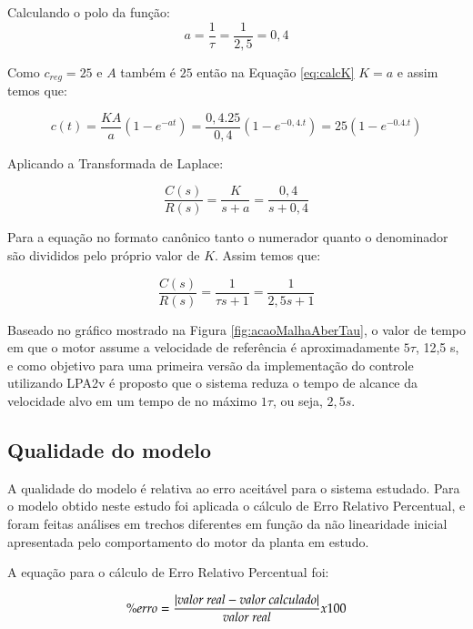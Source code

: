 Calculando o polo da função:
\begin{equation}
  a = \frac{1}{\tau} = \frac{1}{2,5} = 0,4
\end{equation}

Como $c_{reg} = 25$ e $A$ também é $25$ então na Equação \ref{eq:calcK} $K = a$ e assim temos que:

\begin{equation}
c(t) = \frac{KA}{a}(1-e^{-at}) = \frac{0,4.25}{0,4}(1-e^{-0,4.t}) = 25(1-e^{-0.4.t})
\end{equation}


Aplicando a Transformada de Laplace:

\begin{equation}
  \frac{C(s)}{R(s)} = \frac{K}{s+a} = \frac{0,4}{s+0,4}
\end{equation}


Para a equação no formato canônico tanto o numerador quanto o denominador são divididos pelo próprio valor de $K$. Assim temos que:

\begin{equation}
  \frac{C(s)}{R(s)} = \frac{1}{\tau s+1} = \frac{1}{2,5 s+1}
\end{equation}


Baseado no gráfico mostrado na Figura \ref{fig:acaoMalhaAberTau}, o valor de tempo em que o motor assume a velocidade de referência é aproximadamente $5\tau$, 12,5 s, e como objetivo para uma primeira versão da implementação do controle utilizando LPA2v é proposto que o sistema reduza o tempo de alcance da velocidade alvo em um tempo de no máximo $1\tau$, ou seja, $2,5 s$.


\subsection{ Qualidade do modelo }

A qualidade do modelo é relativa ao erro aceitável para o sistema estudado. Para o modelo obtido neste estudo foi aplicada o cálculo de Erro Relativo Percentual, e foram feitas análises em trechos diferentes em função da não linearidade inicial apresentada pelo comportamento do motor da planta em estudo.

A equação para o cálculo de Erro Relativo Percentual foi:

\begin{equation}
 \% erro = \frac{| \text{\emph{valor real}} -\text{\emph{valor calculado}} |}{\text{\emph{valor real}}} x 100
\end{equation}

